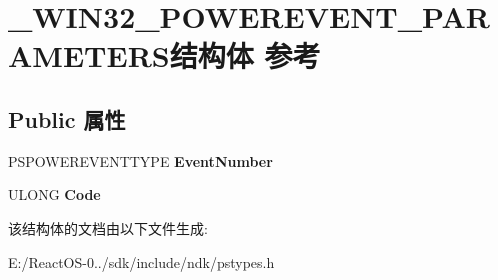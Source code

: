 \hypertarget{struct___w_i_n32___p_o_w_e_r_e_v_e_n_t___p_a_r_a_m_e_t_e_r_s}{}\section{\+\_\+\+W\+I\+N32\+\_\+\+P\+O\+W\+E\+R\+E\+V\+E\+N\+T\+\_\+\+P\+A\+R\+A\+M\+E\+T\+E\+R\+S结构体 参考}
\label{struct___w_i_n32___p_o_w_e_r_e_v_e_n_t___p_a_r_a_m_e_t_e_r_s}
\subsection*{Public 属性}
\begin{DoxyCompactItemize}
\item 
\mbox{\label{struct___w_i_n32___p_o_w_e_r_e_v_e_n_t___p_a_r_a_m_e_t_e_r_s_ae2bb13ec04fe382ba85efeebf643b80a}} 
P\+S\+P\+O\+W\+E\+R\+E\+V\+E\+N\+T\+T\+Y\+PE {\bfseries Event\+Number}
\item 
\mbox{\label{struct___w_i_n32___p_o_w_e_r_e_v_e_n_t___p_a_r_a_m_e_t_e_r_s_a7043e4949f6b3892ba057eda85d7f3f5}} 
U\+L\+O\+NG {\bfseries Code}
\end{DoxyCompactItemize}


该结构体的文档由以下文件生成\+:\begin{DoxyCompactItemize}
\item 
E\+:/\+React\+O\+S-\/0../sdk/include/ndk/pstypes.\+h\end{DoxyCompactItemize}
